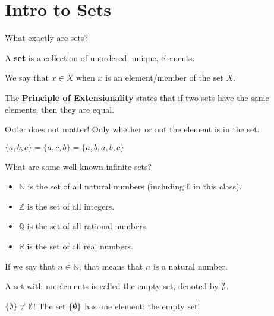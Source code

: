 \documentclass[a4paper]{article}
\begin{document}
\section{Intro to Sets}

What exactly are sets?

\begin{definition}
	A \textbf{set} is a collection of unordered, unique, elements.
\end{definition}

\begin{notation}
	We say that \( x \in  X \) when \( x \) is an element/member of the set \( X \).
\end{notation}

\begin{definition}
	The \textbf{Principle of Extensionality} states that if two sets have the same elements, then they are equal.
\end{definition}

\begin{note}
	Order does not matter! Only whether or not the element is in the set.
\end{note}

\begin{eg}
	\( \{a, b, c\} = \{a, c, b\} =\{a, b, a, b, c\}     \)
\end{eg}

What are some well known infinite sets?
\begin{itemize}
	\item \( \mathbb{N} \) is the set of all natural numbers (including 0 in this class).
	\item \( \mathbb{Z} \) is the set of all integers.
	\item \( \mathbb{Q} \) is the set of all rational numbers.
	\item \( \mathbb{R} \) is the set of all real numbers.
\end{itemize}

\begin{notation}
	If we say that \( n \in \mathbb{N} \), that means that \( n \) is a natural number.
\end{notation}

\begin{definition}
	A set with no elements is called the empty set, denoted by \( \emptyset \).
\end{definition}

\begin{note}
	\( \{\emptyset\} \neq \emptyset  \)! The set \( \{\emptyset\}   \) has one element: the empty set!
\end{note}
\end{document}
